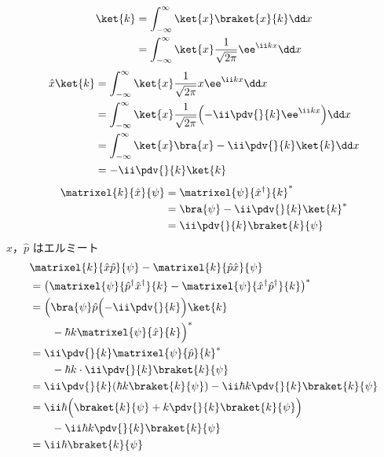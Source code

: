 \begin{align*}
\ket{k}&=\int_{-\infty}^{\infty}\ket{x}\braket{x}{k}\dd x\\
&=\int_{-\infty}^{\infty}\ket{x}\frac{1}{\sqrt{2\pi}}\ee^{\ii kx}\dd x
\end{align*}
\begin{align*}
\hat{x}\ket{k}&=\int_{-\infty}^{\infty}\ket{x}\frac{1}{\sqrt{2\pi}}x\ee^{\ii kx}\dd x\\
&=\int_{-\infty}^{\infty}\ket{x}\frac{1}{\sqrt{2\pi}}\Bigl(-\ii\pdv{}{k}\ee^{\ii kx}\Bigr)\dd x\\
&=\int_{-\infty}^{\infty}\ket{x}\bra{x}-\ii\pdv{}{k}\ket{k}\dd x\\
&=-\ii\pdv{}{k}\ket{k}
\end{align*}
\begin{align*}
\matrixel{k}{\hat{x}}{\psi}&=\matrixel{\psi}{\hat{x}^{\dagger}}{k}^{*}\\
&=\bra{\psi}-\ii\pdv{}{k}\ket{k}^{*}\\
&=\ii\pdv{}{k}\braket{k}{\psi}
\end{align*}
$\hat{x}$，$\hat{p}$ はエルミート
\begin{align*}
&\matrixel{k}{\hat{x}\hat{p}}{\psi}-\matrixel{k}{\hat{p}\hat{x}}{\psi}\\
&=\bigl(\matrixel{\psi}{\hat{p}^{\dagger}\hat{x}^{\dagger}}{k}-\matrixel{\psi}{\hat{x}^{\dagger}\hat{p}^{\dagger}}{k}\bigr)^{*}\\
&=\Bigl(\bra{\psi}\hat{p}\Bigl(-\ii\pdv{}{k}\Bigr)\ket{k}\\
&\qquad-\hbar k\matrixel{\psi}{\hat{x}}{k}\Bigr)^{*}\\
&=\ii\pdv{}{k}\matrixel{\psi}{\hat{p}}{k}^{*}\\
&\qquad-\hbar k\cdot\ii\pdv{}{k}\braket{k}{\psi}\\
&=\ii\pdv{}{k}(\hbar k\braket{k}{\psi})-\ii\hbar k\pdv{}{k}\braket{k}{\psi}\\
&=\ii\hbar\Bigl(\braket{k}{\psi}+k\pdv{}{k}\braket{k}{\psi}\Bigr)\\
&\qquad-\ii\hbar k\pdv{}{k}\braket{k}{\psi}\\
&=\ii\hbar\braket{k}{\psi}
\end{align*}
